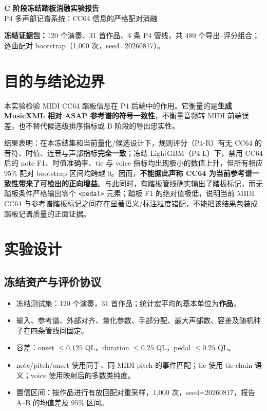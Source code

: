 \documentclass[11pt,a4paper]{ctexart}
\begin{document}
\begin{center}
{\LARGE\bfseries\color{navy} C 阶段冻结踏板消融实验报告}\\[7pt]
{\large P4 多声部记谱系统：CC64 信息的严格配对消融}\\[10pt]
\colorbox{light}{\parbox{0.88\textwidth}{\centering\small
\textbf{冻结证据包：}120 个演奏、31 首作品、4 条 P4 管线，共 480 个导出--评分组合；\\
逐曲配对 bootstrap（1,000 次，seed=20260817）。}}
\end{center}

\section{目的与结论边界}
本实验检验 MIDI CC64 踏板信息在 P4 后端中的作用。它衡量的是\textbf{生成 MusicXML 相对 ASAP 参考谱的符号一致性}，不衡量音频转 MIDI 前端误差，也不替代候选级排序指标或 B 阶段的导出忠实性。

结果表明：在本冻结集和当前量化/候选设计下，规则评分（P4-R）有无 CC64 的音符、时值、连音与声部指标\textbf{完全一致}；冻结 LightGBM（P4-L）下，禁用 CC64 后的 note F1、时值准确率、tie 与 voice 指标均出现极小的数值上升，但所有相应 95\% 配对 bootstrap 区间均跨越 0。因而，\textbf{不能据此声称 CC64 为当前参考谱一致性带来了可检出的正向增益}。与此同时，有踏板管线确实输出了踏板标记，而无踏板条件严格输出零个 \texttt{<pedal>} 元素；踏板 F1 的绝对值极低，说明当前 MIDI CC64 与参考谱踏板标记之间存在显著语义/标注粒度错配，不能把该结果包装成踏板记谱质量的正面证据。

\section{实验设计}
\subsection{冻结资产与评价协议}
\begin{itemize}
  \item 冻结测试集：120 个演奏，31 首作品；统计宏平均的基本单位为\textbf{作品}。
  \item 输入、参考谱、外部对齐、量化参数、手部分配、最大声部数、容差及随机种子在四条管线间固定。
  \item 容差：onset $\leq 0.125$ QL，duration $\leq 0.25$ QL，pedal $\leq 0.25$ QL。
  \item note/pitch/onset 使用同手、同 MIDI pitch 的事件匹配；tie 使用 tie-chain 语义；voice 使用映射后的多数类纯度。
  \item 置信区间：按作品进行有放回配对重采样，1,000 次，seed=20260817，报告 A--B 的均值差及 95\% 区间。
\end{itemize}
\end{document}

